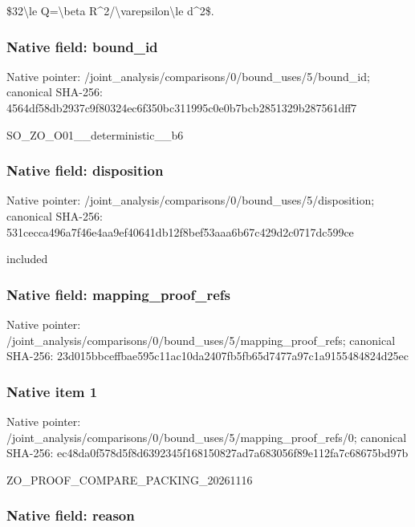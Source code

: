 \documentclass[10pt,a4paper]{article}
\begin{document}
\$32\textbackslash{}le Q=\textbackslash{}beta R\textasciicircum{}2/\textbackslash{}varepsilon\textbackslash{}le d\textasciicircum{}2\$.


\subsubsection{Native field: bound\_id}


Native pointer: /joint\_analysis/comparis\allowbreak{}ons/0/bound\_uses/5/bound\allowbreak{}\_id; canonical SHA-256: 4564df58db2937c9f80324ec\allowbreak{}6f350bc311995c0e0b7bcb28\allowbreak{}51329b287561dff7


SO\_ZO\_O01\_\_deterministic\_\_b6


\subsubsection{Native field: disposition}


Native pointer: /joint\_analysis/comparis\allowbreak{}ons/0/bound\_uses/5/dispo\allowbreak{}sition; canonical SHA-256: 531cecca496a7f46e4aa9ef4\allowbreak{}0641db12f8bef53aaa6b67c4\allowbreak{}29d2c0717dc599ce


included


\subsubsection{Native field: mapping\_proof\_refs}


Native pointer: /joint\_analysis/comparis\allowbreak{}ons/0/bound\_uses/5/mappi\allowbreak{}ng\_proof\_refs; canonical SHA-256: 23d015bbceffbae595c11ac1\allowbreak{}0da2407fb5fb65d7477a97c1\allowbreak{}a9155484824d25ec



\subsubsection{Native item 1}


Native pointer: /joint\_analysis/comparis\allowbreak{}ons/0/bound\_uses/5/mappi\allowbreak{}ng\_proof\_refs/0; canonical SHA-256: ec48da0f578d5f8d6392345f\allowbreak{}168150827ad7a683056f89e1\allowbreak{}12fa7c68675bd97b


ZO\_PROOF\_COMPARE\_PACKING\_20261116


\subsubsection{Native field: reason}
\end{document}
